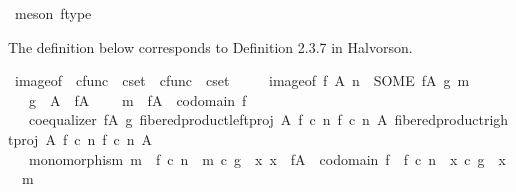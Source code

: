 \begin{isabellebody}
\ {\isacharparenleft}{\kern0pt}meson\ f{\isacharunderscore}{\kern0pt}type{\isacharparenright}{\kern0pt}%
\endisatagproof
{\isafoldproof}%
%
\isadelimproof
%
\endisadelimproof
%
\isadelimdocument
%
\endisadelimdocument
%
\isatagdocument
%
\isamarkuptrue%
%
\endisatagdocument
{\isafolddocument}%
%
\isadelimdocument
%
\endisadelimdocument
%
\begin{isamarkuptext}%
The definition below corresponds to Definition 2.3.7 in Halvorson.%
\end{isamarkuptext}\isamarkuptrue%
\isamarkupfalse%
\ image{\isacharunderscore}{\kern0pt}of\ {\isacharcolon}{\kern0pt}{\isacharcolon}{\kern0pt}\ {\isachardoublequoteopen}cfunc\ {\isasymRightarrow}\ cset\ {\isasymRightarrow}\ cfunc\ {\isasymRightarrow}\ cset{\isachardoublequoteclose}\ {\isacharparenleft}{\kern0pt}{\isachardoublequoteopen}{\isacharunderscore}{\kern0pt}{\isasymlparr}{\isacharunderscore}{\kern0pt}{\isasymrparr}\isactrlbsub {\isacharunderscore}{\kern0pt}\isactrlesub {\isachardoublequoteclose}\ {\isacharbrackleft}{\kern0pt}{}{}{}{\isacharcomma}{\kern0pt}{}{\isacharcomma}{\kern0pt}{}{\isacharbrackright}{\kern0pt}{}{}{}{\isacharparenright}{\kern0pt}\ \isanewline
\ \ {\isachardoublequoteopen}image{\isacharunderscore}{\kern0pt}of\ f\ A\ n\ {\isacharequal}{\kern0pt}\ {\isacharparenleft}{\kern0pt}SOME\ fA{\isachardot}{\kern0pt}\ {\isasymexists}g\ m{\isachardot}{\kern0pt}\isanewline
\ \ \ g\ {\isacharcolon}{\kern0pt}\ A\ {\isasymrightarrow}\ fA\ {\isasymand}\isanewline
\ \ \ m\ {\isacharcolon}{\kern0pt}\ fA\ {\isasymrightarrow}\ codomain\ f\ {\isasymand}\isanewline
\ \ \ coequalizer\ fA\ g\ {\isacharparenleft}{\kern0pt}fibered{\isacharunderscore}{\kern0pt}product{\isacharunderscore}{\kern0pt}left{\isacharunderscore}{\kern0pt}proj\ A\ {\isacharparenleft}{\kern0pt}f\ {\isasymcirc}\isactrlsub c\ n{\isacharparenright}{\kern0pt}\ {\isacharparenleft}{\kern0pt}f\ {\isasymcirc}\isactrlsub c\ n{\isacharparenright}{\kern0pt}\ A{\isacharparenright}{\kern0pt}\ {\isacharparenleft}{\kern0pt}fibered{\isacharunderscore}{\kern0pt}product{\isacharunderscore}{\kern0pt}right{\isacharunderscore}{\kern0pt}proj\ A\ {\isacharparenleft}{\kern0pt}f\ {\isasymcirc}\isactrlsub c\ n{\isacharparenright}{\kern0pt}\ {\isacharparenleft}{\kern0pt}f\ {\isasymcirc}\isactrlsub c\ n{\isacharparenright}{\kern0pt}\ A{\isacharparenright}{\kern0pt}\ {\isasymand}\isanewline
\ \ \ monomorphism\ m\ {\isasymand}\ f\ {\isasymcirc}\isactrlsub c\ n\ {\isacharequal}{\kern0pt}\ m\ {\isasymcirc}\isactrlsub c\ g\ {\isasymand}\ {\isacharparenleft}{\kern0pt}{\isasymforall}x{\isachardot}{\kern0pt}\ x\ {\isacharcolon}{\kern0pt}\ fA\ {\isasymrightarrow}\ codomain\ f\ {\isasymlongrightarrow}\ f\ {\isasymcirc}\isactrlsub c\ n\ {\isacharequal}{\kern0pt}\ x\ {\isasymcirc}\isactrlsub c\ g\ {\isasymlongrightarrow}\ x\ {\isacharequal}{\kern0pt}\ m{\isacharparenright}{\kern0pt}{\isacharparenright}{\kern0pt}{\isachardoublequoteclose}\isanewline

\end{isabellebody}
